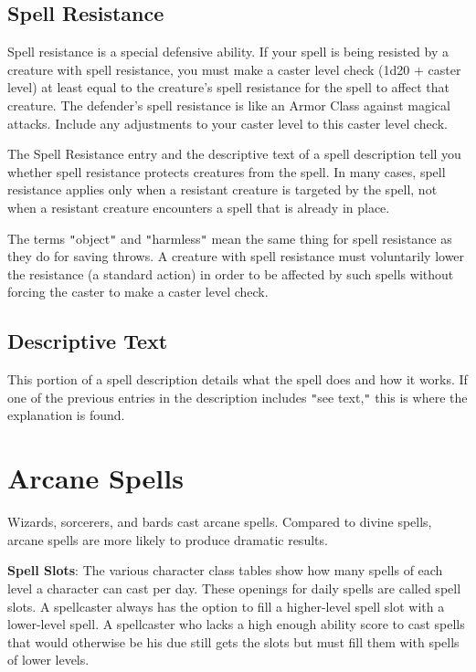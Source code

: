 \subsection{Spell Resistance}

				
Spell resistance is a special defensive ability. If your spell is being resisted by a creature with spell resistance, you must make a caster level check (1d20 + caster level) at least equal to the creature's spell resistance for the spell to affect that creature. The defender's spell resistance is like an Armor Class against magical attacks. Include any adjustments to your caster level to this caster level check.
				
The Spell Resistance entry and the descriptive text of a spell description tell you whether spell resistance protects creatures from the spell. In many cases, spell resistance applies only when a resistant creature is targeted by the spell, not when a resistant creature encounters a spell that is already in place.
				
The terms \texttt{{}"{}}object\texttt{{}"{}} and \texttt{{}"{}}harmless\texttt{{}"{}} mean the same thing for spell resistance as they do for saving throws. A creature with spell resistance must voluntarily lower the resistance (a standard action) in order to be affected by such spells without forcing the caster to make a caster level check.
				
\subsection{Descriptive Text}

				
This portion of a spell description details what the spell does and how it works. If one of the previous entries in the description includes \texttt{{}"{}}see text,\texttt{{}"{}} this is where the explanation is found. 
				
\section{Arcane Spells}

				
Wizards, sorcerers, and bards cast arcane spells. Compared to divine spells, arcane spells are more likely to produce dramatic results.
				
\textbf{Spell Slots}: The various character class tables show how many spells of each level a character can cast per day. These openings for daily spells are called spell slots. A spellcaster always has the option to fill a higher-level spell slot with a lower-level spell. A spellcaster who lacks a high enough ability score to cast spells that would otherwise be his due still gets the slots but must fill them with spells of lower levels.
				
